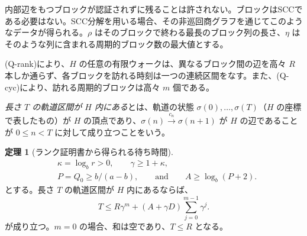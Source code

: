 \documentclass[11pt,reqno]{amsart}
\theoremstyle{definition}
\newtheorem{theorem}{定理}
\theoremstyle{definition}
\theoremstyle{remark}
\begin{document}
内部辺をもつブロックが認証されずに残ることは許されない。ブロックはSCCである必要はない。SCC分解を用いる場合、その非巡回商グラフを通じてこのようなデータが得られる。\(\rho\) はそのブロックで終わる最長のブロック列の長さ、\(\eta\) はそのような列に含まれる周期的ブロック数の最大値とする。

(Q-rank)により、\(H\) の任意の有限ウォークは、異なるブロック間の辺を高々 \(R\) 本しか通らず、各ブロックを訪れる時刻は一つの連続区間をなす。また、(Q-cyc)により、訪れる周期的ブロックは高々 \(m\) 個である。

\emph{長さ \(T\) の軌道区間が \(H\) 内にある}とは、軌道の状態 \(\sigma(0),\ldots,\sigma(T)\)（\(H\) の座標で表したもの）が \(H\) の頂点であり、\(\sigma(n)\xrightarrow{c_n}\sigma(n+1)\) が \(H\) の辺であることが \(0\le n<T\) に対して成り立つことをいう。

\begin{samepage}
\begin{theorem}[ランク証明書から得られる待ち時間]\leavevmode\label{thm:27}
\[
\begin{aligned}
&\kappa=\log_br>0,\qquad \gamma\ge1+\kappa,\\
&P=Q_0\ge b/(a-b),\qquad\text{and}\qquad A\ge\log_b(P+2).
\end{aligned}
\]
とする。長さ \(T\) の軌道区間が \(H\) 内にあるならば、
\[
T\le R\gamma^m+(A+\gamma D)\sum_{j=0}^{m-1}\gamma^j .
\tag{24}\label{eq:24}
\]
が成り立つ。\(m=0\) の場合、和は空であり、\(T\le R\) となる。
\label{thm-end:27}
\end{theorem}
\end{samepage}
\end{document}
